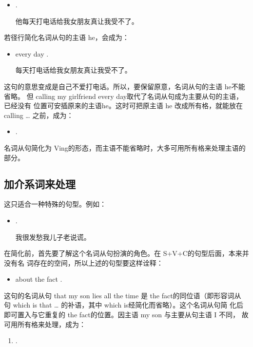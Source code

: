 \begin{itemize}
\item {} 
  .

  他每天打电话给我女朋友真让我受不了。
\end{itemize}
若径行简化名词从句的主语 he，会成为：
\begin{itemize}
\item {} every day  .

  每天打电话给我女朋友真让我受不了。
\end{itemize}
这句的意思变成是自己不爱打电话。所以，要保留原意，名词从句的主语 he不能省略。
但 calling my girlfriend every day取代了名词从句成为主要从句的主语，已经没有
位置可安插原来的主语he。这时可把原主语 he 改成所有格，就能放在 calling
\ldots{} 之前，成为：
\begin{itemize}
\item {} 
  .
\end{itemize}

名词从句简化为 Ving的形态，而主语不能省略时，大多可用所有格来处理主语的部分。

\subsection{加介系词来处理}

这只适合一种特殊的句型。例如：
\begin{itemize}
\item {}   .

  我很发愁我儿子老说谎。
\end{itemize}
在简化前，首先要了解这个名词从句扮演的角色。在 S+V+C的句型后面，本来并没有名
词存在的空间，所以上述的句型要这样诠释：
\begin{itemize}
\item {}   about the fact .
\end{itemize}
这句的名词从句 that my son lies all the time 是 the fact的同位语（即形容词从
句 which is that \ldots{} 的补语，其中 which is经简化而省略）。这个名词从句简
化后即可置入与它重复的 the fact的位置。因主语 my son 与主要从句主语 I 不同，
故可用所有格来处理，成为：
\begin{enumerate}
\item {}    .
\end{enumerate}

